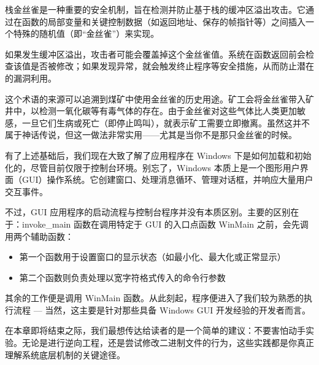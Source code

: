 栈金丝雀是一种重要的安全机制，旨在检测并防止基于栈的缓冲区溢出攻击。它通过在函数的局部变量和关键控制数据（如返回地址、保存的帧指针等）之间插入一个特殊的随机值（即“金丝雀”）来实现。

如果发生缓冲区溢出，攻击者可能会覆盖掉这个金丝雀值。系统在函数返回前会检查该值是否被修改；如果发现异常，就会触发终止程序等安全措施，从而防止潜在的漏洞利用。

这个术语的来源可以追溯到煤矿中使用金丝雀的历史用途。矿工会将金丝雀带入矿井中，以检测一氧化碳等有毒气体的存在。由于金丝雀对这些气体比人类更加敏感，一旦它们生病或死亡（即停止鸣叫），就表示矿工需要立即撤离。虽然这并不属于神话传说，但这一做法非常实用——尤其是当你不是那只金丝雀的时候。

有了上述基础后，我们现在大致了解了应用程序在 Windows 下是如何加载和初始化的，尽管目前仅限于控制台环境。别忘了，Windows 本质上是一个图形用户界面（GUI）操作系统。它创建窗口、处理消息循环、管理对话框，并响应大量用户交互事件。

不过，GUI 应用程序的启动流程与控制台程序并没有本质区别。主要的区别在于：invoke\_main 函数在调用特定于 GUI 的入口点函数 WinMain 之前，会先调用两个辅助函数：

\begin{itemize}
\item 
第一个函数用于设置窗口的显示状态（如最小化、最大化或正常显示）

\item 
第二个函数则负责处理以宽字符格式传入的命令行参数
\end{itemize}

其余的工作便是调用 WinMain 函数。从此刻起，程序便进入了我们较为熟悉的执行流程 --- 当然，这主要是针对那些具备 Windows GUI 开发经验的开发者而言。

在本章即将结束之际，我们最想传达给读者的是一个简单的建议：不要害怕动手实验。无论是进行逆向工程，还是尝试修改二进制文件的行为，这些实践都是你真正理解系统底层机制的关键途径。





